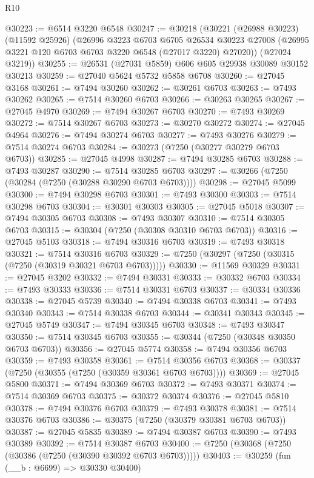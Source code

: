 \begin{lexlean}{R10}
\begin{coremodule}
@30223 := @6514 @3220 @6548
@30247 := @30218
    (@30221
      (@26988 @30223)
      (@11592 @25926)
      (@26996
        @3223
        @6703
        @6705
        @26534
        @30223
        @27008
        (@26995 @3221 @120 @6703 @6703 @3220 @6548 (@27017 @3220) @27020))
      (@27024 @3219))
@30255 := @26531 (@27031 @5859) @606 @605 @29938 @30089 @30152 @30213
@30259 := @27040 @5624 @5732 @5858 @6708
@30260 := @27045 @3168
@30261 := @7494 @30260
@30262 := @30261 @6703
@30263 := @7493 @30262
@30265 := @7514 @30260 @6703
@30266 := @30263 @30265
@30267 := @27045 @4970
@30269 := @7494 @30267 @6703
@30270 := @7493 @30269
@30272 := @7514 @30267 @6703
@30273 := @30270 @30272
@30274 := @27045 @4964
@30276 := @7494 @30274 @6703
@30277 := @7493 @30276
@30279 := @7514 @30274 @6703
@30284 := @30273 (@7250 (@30277 @30279 @6703 @6703))
@30285 := @27045 @4998
@30287 := @7494 @30285 @6703
@30288 := @7493 @30287
@30290 := @7514 @30285 @6703
@30297 := @30266 (@7250 (@30284 (@7250 (@30288 @30290 @6703 @6703))))
@30298 := @27045 @5099
@30300 := @7494 @30298 @6703
@30301 := @7493 @30300
@30303 := @7514 @30298 @6703
@30304 := @30301 @30303
@30305 := @27045 @5018
@30307 := @7494 @30305 @6703
@30308 := @7493 @30307
@30310 := @7514 @30305 @6703
@30315 := @30304 (@7250 (@30308 @30310 @6703 @6703))
@30316 := @27045 @5103
@30318 := @7494 @30316 @6703
@30319 := @7493 @30318
@30321 := @7514 @30316 @6703
@30329 := @7250 (@30297 (@7250 (@30315 (@7250 (@30319 @30321 @6703 @6703)))))
@30330 := @11569 @30329
@30331 := @27045 @3202
@30332 := @7494 @30331
@30333 := @30332 @6703
@30334 := @7493 @30333
@30336 := @7514 @30331 @6703
@30337 := @30334 @30336
@30338 := @27045 @5739
@30340 := @7494 @30338 @6703
@30341 := @7493 @30340
@30343 := @7514 @30338 @6703
@30344 := @30341 @30343
@30345 := @27045 @5749
@30347 := @7494 @30345 @6703
@30348 := @7493 @30347
@30350 := @7514 @30345 @6703
@30355 := @30344 (@7250 (@30348 @30350 @6703 @6703))
@30356 := @27045 @5774
@30358 := @7494 @30356 @6703
@30359 := @7493 @30358
@30361 := @7514 @30356 @6703
@30368 := @30337 (@7250 (@30355 (@7250 (@30359 @30361 @6703 @6703))))
@30369 := @27045 @5800
@30371 := @7494 @30369 @6703
@30372 := @7493 @30371
@30374 := @7514 @30369 @6703
@30375 := @30372 @30374
@30376 := @27045 @5810
@30378 := @7494 @30376 @6703
@30379 := @7493 @30378
@30381 := @7514 @30376 @6703
@30386 := @30375 (@7250 (@30379 @30381 @6703 @6703))
@30387 := @27045 @5835
@30389 := @7494 @30387 @6703
@30390 := @7493 @30389
@30392 := @7514 @30387 @6703
@30400 := @7250 (@30368 (@7250 (@30386 (@7250 (@30390 @30392 @6703 @6703)))))
@30403 := @30259 (fun (__b : @6699) => @30330 @30400)

\end{coremodule}
\end{lexlean}
